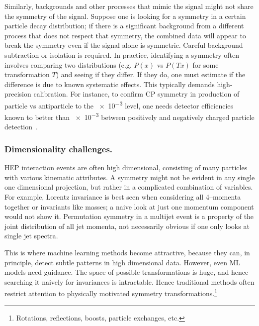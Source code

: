         Similarly, backgrounds and other processes that mimic the signal might not share the symmetry of the signal.
        Suppose one is looking for a symmetry in a certain particle decay distribution; if there is a significant background from a different process that does not respect that symmetry, the combined data will appear to break the symmetry even if the signal alone is symmetric.
        Careful background subtraction or isolation is required.
        In practice, identifying a symmetry often involves comparing two distributions (e.g. $P(x)$ vs $P(Tx)$ for some transformation $T$) and seeing if they differ. If they do, one must estimate if the difference is due to known systematic effects.
        This typically demands high-precision calibration.
        For instance, to confirm CP symmetry in production of particle vs antiparticle to the \num{e-3} level, one needs detector efficiencies known to better than \num{e-3} between positively and negatively charged particle detection~\cite{Gordon:2013eha}.

        \subsubsection{Dimensionality challenges.}
            HEP interaction events are often high dimensional, consisting of many particles with various kinematic attributes.
            A symmetry might not be evident in any single one dimensional projection, but rather in a complicated combination of variables.
            For example, Lorentz invariance is best seen when considering all 4--momenta together or invariants like masses; a naive look at just one momentum component would not show it.
            Permutation symmetry in a multijet event is a property of the joint distribution of all jet momenta, not necessarily obvious if one only looks at single jet spectra.
           
            This is where machine learning methods become attractive, because they can, in principle, detect subtle patterns in high dimensional data.
            However, even ML models need guidance.
            The space of possible transformations is huge, and hence searching it naively for invariances is intractable.
            Hence traditional methods often restrict attention to physically motivated symmetry transformations.\footnote{Rotations, reflections, boosts, particle exchanges, etc.}

